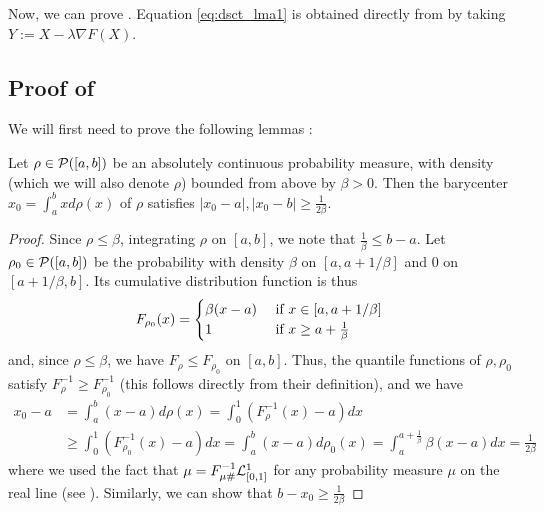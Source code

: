 Now, we can prove .  
    Equation \eqref{eq:dsct_lma1} is obtained directly from  by taking $Y := X - \lambda \nabla F(X)$. %

\subsection{Proof of \texorpdfstring{}{}} \label{sec:proof_descent_well_behaved}

We will first need to prove the following lemmas :

\begin{lemma} \label{lemma:barycenter_bound_distance}
    Let $\rho \in \mathcal{P}([a,b])$ be an absolutely continuous probability measure, with density (which we will also denote $\rho$) bounded from above by $\beta > 0$. Then the barycenter $x_0 = \int_a^b x d\rho(x)$ of $\rho$ satisfies $|x_0 - a|, |x_0 - b| \geq \frac{1}{2\beta}$.
\end{lemma}

\begin{proof}
    Since $\rho \leq \beta$, integrating $\rho$ on $[a,b]$, we note that $\frac{1}{\beta} \leq b-a$. Let $\rho_0 \in \mathcal{P}([a,b])$ be the probability with density $\beta$ on $[a,a+1/\beta]$ and $0$ on $[a+1/\beta,b]$. Its cumulative distribution function is thus
    \begin{equation}
         F_{\rho_0}(x) = \begin{cases}
        \beta(x-a) & \hbox{ if } x \in [a,a+1/\beta] \\
        1 & \hbox{ if } x \geq a+\frac{1}{\beta}
        \end{cases}
    \end{equation}
    and, since $\rho \leq \beta$, we have $F_{\rho} \leq F_{\rho_0}$ on $[a,b]$. Thus, the quantile functions of $\rho,\rho_0$ satisfy $F_{\rho}^{-1} \geq F^{-1}_{\rho_0}$ (this follows directly from their definition), and we have
    \begin{align}
        x_0 - a &= \int_a^b (x-a) d\rho(x) = \int_0^1 (F^{-1}_{\rho}(x) - a)dx \\
        &\geq \int_0^1 (F^{-1}_{\rho_0}(x)-a) dx = \int_a^b (x-a) d\rho_0(x) = \int_a^{a+\frac{1}{\beta}} \beta (x-a) dx = \frac{1}{2\beta}
    \end{align}
    where we used the fact that $\mu = F^{-1}_{\mu\#}\mathcal L^1_{[0,1]}$ for any probability measure $\mu$ on the real line (see \citep[Proposition 2.2]{santambrogio2015optimal}). Similarly, we can show that $b - x_0 \geq \frac{1}{2\beta}$
\end{proof}

